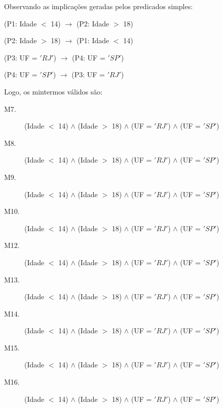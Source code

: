 \documentclass[12pt,a4paper]{article}
\begin{document}
\noindent
\begin{flushleft}
Observando as implicações geradas pelos predicados simples:
\begin{description}
	\item (P1: Idade $<$ 14) $\longrightarrow$ \textlnot (P2: Idade $>$ 18)
	\item (P2: Idade $>$ 18) $\longrightarrow$ \textlnot (P1: Idade $<$ 14) 
	\item (P3: UF = $'RJ'$) $\longrightarrow$ \textlnot (P4: UF = $'SP'$)
	\item (P4: UF = $'SP'$) $\longrightarrow$ \textlnot (P3: UF = $'RJ'$)
\end{description}
\end{flushleft}

\noindent
\begin{flushleft}
	Logo, os mintermos válidos são:
	\begin{description}
		\item[M7.] (Idade $<$ 14) $\wedge$ \textlnot (Idade $>$ 18) $\wedge$ (UF = $'RJ'$) $\wedge$ \textlnot (UF = $'SP'$)
		\item[M8.] \textlnot (Idade $<$ 14) $\wedge$ (Idade $>$ 18) $\wedge$ (UF = $'RJ'$) $\wedge$ \textlnot (UF = $'SP'$)
		\item[M9.] (Idade $<$ 14) $\wedge$ \textlnot (Idade $>$ 18) $\wedge$ \textlnot (UF = $'RJ'$) $\wedge$ (UF = $'SP'$)
		\item[M10.] \textlnot (Idade $<$ 14) $\wedge$ (Idade $>$ 18) $\wedge$ \textlnot (UF = $'RJ'$) $\wedge$ (UF = $'SP'$)
		\item[M12.] (Idade $<$ 14) $\wedge$ \textlnot (Idade $>$ 18) $\wedge$ \textlnot (UF = $'RJ'$) $\wedge$ \textlnot (UF = $'SP'$)
		\item[M13.] \textlnot (Idade $<$ 14) $\wedge$ (Idade $>$ 18) $\wedge$ \textlnot (UF = $'RJ'$) $\wedge$ \textlnot (UF = $'SP'$)
		\item[M14.] \textlnot (Idade $<$ 14) $\wedge$ \textlnot (Idade $>$ 18) $\wedge$ (UF = $'RJ'$) $\wedge$ \textlnot (UF = $'SP'$)
		\item[M15.] \textlnot (Idade $<$ 14) $\wedge$ \textlnot (Idade $>$ 18) $\wedge$ \textlnot (UF = $'RJ'$) $\wedge$ (UF = $'SP'$)
		\item[M16.] \textlnot (Idade $<$ 14) $\wedge$ \textlnot (Idade $>$ 18) $\wedge$ \textlnot (UF = $'RJ'$) $\wedge$ \textlnot (UF = $'SP'$)
	\end{description}
\end{flushleft}
\end{document}
